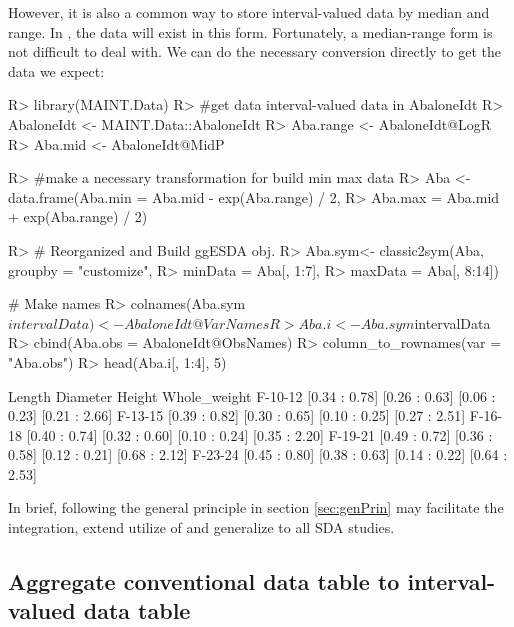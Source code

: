 \documentclass[article]{jss}
\begin{document}
However, it is also a common way to store interval-valued data by median and range. In , the data will exist in this form. Fortunately, a median-range form is not difficult to deal with. We can do the necessary conversion directly to get the data we expect:
\begin{CodeChunk}
\begin{CodeInput}
R> library(MAINT.Data)
R> #get data interval-valued data in AbaloneIdt
R> AbaloneIdt <- MAINT.Data::AbaloneIdt
R> Aba.range <- AbaloneIdt@LogR
R> Aba.mid <- AbaloneIdt@MidP


R> #make a necessary transformation for build min max data
R> Aba <- data.frame(Aba.min = Aba.mid - exp(Aba.range) / 2,
R>                   Aba.max = Aba.mid + exp(Aba.range) / 2)


R> # Reorganized and Build ggESDA obj.
R> Aba.sym<- classic2sym(Aba, groupby = "customize",
R>                       minData = Aba[, 1:7],
R>                       maxData = Aba[, 8:14])


# Make names
R> colnames(Aba.sym$intervalData) <- AbaloneIdt@VarNames
R> Aba.i <- Aba.sym$intervalData %
R>   cbind(Aba.obs = AbaloneIdt@ObsNames) %
R>   column_to_rownames(var = "Aba.obs")
R> head(Aba.i[, 1:4], 5)
\end{CodeInput}
\begin{CodeOutput}
        Length         Diameter      Height        Whole_weight
F-10-12 [0.34 : 0.78] [0.26 : 0.63] [0.06 : 0.23] [0.21 : 2.66]
F-13-15 [0.39 : 0.82] [0.30 : 0.65] [0.10 : 0.25] [0.27 : 2.51]
F-16-18 [0.40 : 0.74] [0.32 : 0.60] [0.10 : 0.24] [0.35 : 2.20]
F-19-21 [0.49 : 0.72] [0.36 : 0.58] [0.12 : 0.21] [0.68 : 2.12]
F-23-24 [0.45 : 0.80] [0.38 : 0.63] [0.14 : 0.22] [0.64 : 2.53]
\end{CodeOutput}
\end{CodeChunk}

In brief, following the general principle in section \ref{sec:genPrin} may facilitate the integration, extend utilize of  and generalize to all SDA studies.


\subsection{Aggregate conventional data table to interval-valued data table}\label{sec:aggregation}
\end{document}
